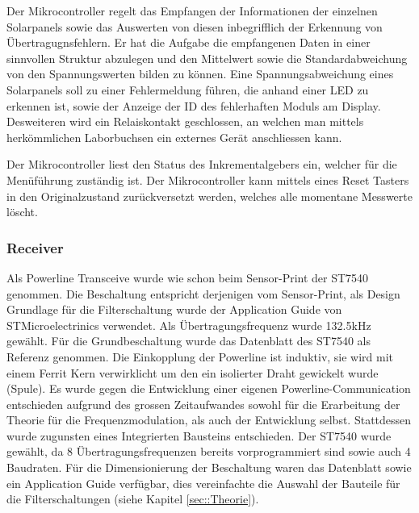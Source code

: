 Der Mikrocontroller regelt das Empfangen der Informationen der einzelnen Solarpanels sowie das Auswerten von diesen inbegrifflich der Erkennung von Übertragugnsfehlern. Er hat die Aufgabe die empfangenen Daten in einer sinnvollen Struktur abzulegen und den Mittelwert sowie die Standardabweichung von den Spannungswerten bilden zu können. Eine Spannungsabweichung eines Solarpanels soll zu einer Fehlermeldung führen, die anhand einer LED zu erkennen ist, sowie der Anzeige der ID des fehlerhaften Moduls am Display. Desweiteren wird ein Relaiskontakt geschlossen, an welchen man mittels herkömmlichen Laborbuchsen ein externes Gerät anschliessen kann.

Der Mikrocontroller liest den Status des Inkrementalgebers ein, welcher für die Menüführung zuständig ist. Der Mikrocontroller kann mittels eines Reset Tasters in den Originalzustand zurückversetzt werden, welches alle momentane Messwerte löscht.

\subsubsection{Receiver}
Als Powerline Transceive wurde wie schon beim Sensor-Print der ST7540 genommen. Die Beschaltung entspricht derjenigen vom Sensor-Print, als Design Grundlage für die Filterschaltung wurde der Application Guide \cite[p. 48]{Applic_Guide_ST7540} von STMicroelectrinics verwendet. Als Übertragungsfrequenz wurde 132.5kHz gewählt. Für die Grundbeschaltung wurde das Datenblatt des ST7540 \cite[p. 40]{Datasheet_ST7540} als Referenz genommen. Die Einkopplung der Powerline ist induktiv, sie wird mit einem Ferrit Kern verwirklicht um den ein isolierter Draht gewickelt wurde (Spule).
Es wurde gegen die Entwicklung einer eigenen Powerline-Communication entschieden aufgrund des grossen Zeitaufwandes sowohl für die Erarbeitung der Theorie für die Frequenzmodulation, als auch der Entwicklung selbst. Stattdessen wurde zugunsten eines Integrierten Bausteins entschieden. Der ST7540 wurde gewählt, da 8 Übertragungsfrequenzen bereits vorprogrammiert sind sowie auch 4 Baudraten. Für die Dimensionierung der Beschaltung waren das Datenblatt \cite{Datasheet_ST7540} sowie ein Application Guide \cite{Applic_Guide_ST7540} verfügbar, dies vereinfachte die Auswahl der Bauteile für die Filterschaltungen (siehe Kapitel \ref{sec::Theorie}).

